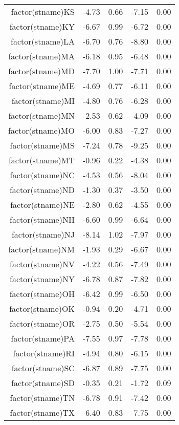 \begin{table}[ht]
\begin{tabular}{rrrrr}
  factor(stname)KS & -4.73 & 0.66 & -7.15 & 0.00 \\ 
  factor(stname)KY & -6.67 & 0.99 & -6.72 & 0.00 \\ 
  factor(stname)LA & -6.70 & 0.76 & -8.80 & 0.00 \\ 
  factor(stname)MA & -6.18 & 0.95 & -6.48 & 0.00 \\ 
  factor(stname)MD & -7.70 & 1.00 & -7.71 & 0.00 \\ 
  factor(stname)ME & -4.69 & 0.77 & -6.11 & 0.00 \\ 
  factor(stname)MI & -4.80 & 0.76 & -6.28 & 0.00 \\ 
  factor(stname)MN & -2.53 & 0.62 & -4.09 & 0.00 \\ 
  factor(stname)MO & -6.00 & 0.83 & -7.27 & 0.00 \\ 
  factor(stname)MS & -7.24 & 0.78 & -9.25 & 0.00 \\ 
  factor(stname)MT & -0.96 & 0.22 & -4.38 & 0.00 \\ 
  factor(stname)NC & -4.53 & 0.56 & -8.04 & 0.00 \\ 
  factor(stname)ND & -1.30 & 0.37 & -3.50 & 0.00 \\ 
  factor(stname)NE & -2.80 & 0.62 & -4.55 & 0.00 \\ 
  factor(stname)NH & -6.60 & 0.99 & -6.64 & 0.00 \\ 
  factor(stname)NJ & -8.14 & 1.02 & -7.97 & 0.00 \\ 
  factor(stname)NM & -1.93 & 0.29 & -6.67 & 0.00 \\ 
  factor(stname)NV & -4.22 & 0.56 & -7.49 & 0.00 \\ 
  factor(stname)NY & -6.78 & 0.87 & -7.82 & 0.00 \\ 
  factor(stname)OH & -6.42 & 0.99 & -6.50 & 0.00 \\ 
  factor(stname)OK & -0.94 & 0.20 & -4.71 & 0.00 \\ 
  factor(stname)OR & -2.75 & 0.50 & -5.54 & 0.00 \\ 
  factor(stname)PA & -7.55 & 0.97 & -7.78 & 0.00 \\ 
  factor(stname)RI & -4.94 & 0.80 & -6.15 & 0.00 \\ 
  factor(stname)SC & -6.87 & 0.89 & -7.75 & 0.00 \\ 
  factor(stname)SD & -0.35 & 0.21 & -1.72 & 0.09 \\ 
  factor(stname)TN & -6.78 & 0.91 & -7.42 & 0.00 \\ 
  factor(stname)TX & -6.40 & 0.83 & -7.75 & 0.00 \\ 

\end{tabular}
\end{table}
